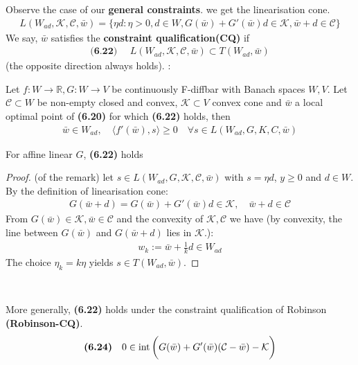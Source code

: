 Observe the case of our \textbf{general constraints}. we get the linearisation cone. 
\begin{align*}
	L(W_{ad}, \mathcal{K}, \mathcal{C}, \bar{w}) = \{\eta d: \eta > 0, d \in W, G(\bar{w}) + G'(\bar{w}) d \in \mathcal{K} ,  \bar{w} + d \in \mathcal{C}\}
\end{align*}
We say, $\bar{w}$ satisfies the \textbf{constraint qualification(CQ)} if 
\begin{align*}
\textbf{(6.22) }\quad
	L(W_{ad}, \mathcal{K}, \mathcal{C}, \bar{w}) \subset T(W_{ad}, \bar{w})
\end{align*} 
(the opposite direction always holds). :
\begin{theorem}
	Let $f : W \rightarrow \mathbb{R}, G: W \rightarrow V$ be continuously F-diffbar with Banach spaces $W, V$. Let $\mathcal{C} \subset W$ be non-empty closed and convex, $\mathcal{K} \subset V$ convex cone and $\bar{w}$ a local optimal point of \textbf{(6.20) } for which \textbf{(6.22)} holds, then
	\begin{align*}
		\bar{w} \in W_{ad}, \quad  \langle f'(\bar{w}), s \rangle \geq 0 \quad \forall s \in L(W_{ad}, G, K, C, \bar{w})
	\end{align*}
\end{theorem}
\begin{remark}
For affine linear $G$, \textbf{(6.22)} holds
\begin{proof}(of the remark) 
	let $s \in L(W_{ad}, G, \mathcal{K}, \mathcal{C}, \bar{w})$ with $s = \eta d$, $y \geq 0$ and $d \in W$. By the definition of linearisation cone: 
	\begin{align*}
		G(\bar{w} + d) = G(\bar{w}) + G'(\bar{w})d \in \mathcal{K} , 
		\quad \bar{w} + d \in \mathcal{C}
	\end{align*}
	From $G(\bar{w}) \in \mathcal{K}, \bar{w} \in \mathcal{C}$ and the convexity of $\mathcal{K}, \mathcal{C}$ we have (by convexity, the line between $G(\bar{w})$ and $G(\bar{w} + d)$ lies in $\mathcal{K}$.):
	\begin{align*}
		w_k:= \bar{w} + \frac{1}{k} d \in W_{ad}
	\end{align*}
	The choice $\eta_k = k \eta $ yields $s \in T(W_{ad}, \bar{w})$. 
\end{proof}	
\end{remark}

\quad\\
\quad\par
More generally, \textbf{(6.22)} holds under the constraint qualification of Robinson \textbf{(Robinson-CQ)}. 
\begin{align*}
\textbf{(6.24)}\quad
	0 \in \operatorname*{int} \bigg(G(\bar{w}) + G'(\bar{w})(\mathcal{C} - \bar{w}) - \mathcal{K}\bigg)
\end{align*}

